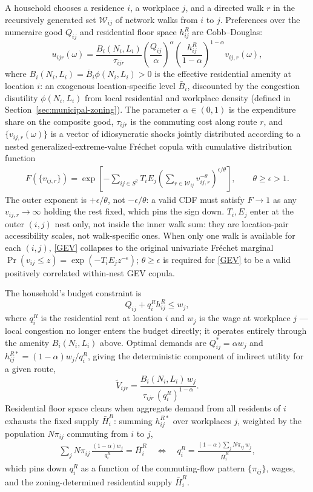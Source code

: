 \documentclass[12pt, a4paper]{article}
\theoremstyle{definition}
\theoremstyle{remark}
\begin{document}
A household chooses a residence $i$, a workplace $j$, and a directed walk $r$ in the recursively generated set $\mathcal W_{ij}$ of network walks from $i$ to $j$. Preferences over the numeraire good $Q_{ij}$ and residential floor space $h_{ij}^R$ are Cobb--Douglas:
\[
u_{ijr}(\omega) = \frac{B_i(N_i,L_i)}{\tau_{ijr}}
\left(\frac{Q_{ij}}{\alpha}\right)^{\!\alpha}
\left(\frac{h_{ij}^R}{1-\alpha}\right)^{\!1-\alpha}
v_{ij,r}(\omega),
\]
where $B_i(N_i,L_i) = \bar B_i \phi(N_i,L_i) > 0$ is the effective residential amenity at location $i$: an exogenous location-specific level $\bar B_i$, discounted by the congestion disutility $\phi(N_i,L_i)$ from local residential and workplace density (defined in Section~\ref{sec:municipal-zoning}). The parameter $\alpha \in (0,1)$ is the expenditure share on the composite good, $\tau_{ijr}$ is the commuting cost along route $r$, and $\{v_{ij,r}(\omega)\}$ is a vector of idiosyncratic shocks jointly distributed according to a nested generalized-extreme-value Fréchet copula with cumulative distribution function
\begin{align}
    \label{GEV}
    F(\{v_{ij,r}\}) = \exp\!\left[-\sum_{ij \in S^{2}} T_iE_j\left(\sum_{r\in \mathcal W_{ij}}v_{ij,r}^{-\theta}\right)^{\!\epsilon/\theta}\right], \qquad \theta \geq \epsilon > 1.
\end{align}
The outer exponent is $+\epsilon/\theta$, not $-\epsilon/\theta$: a valid CDF must satisfy $F\to1$ as any $v_{ij,r}\to\infty$ holding the rest fixed, which pins the sign down. $T_i,E_j$ enter at the outer $(i,j)$ nest only, not inside the inner walk sum: they are location-pair accessibility scales, not walk-specific ones. When only one walk is available for each $(i,j)$, \eqref{GEV} collapses to the original univariate Fréchet marginal $\Pr(v_{ij}\leq z)=\exp(-T_iE_jz^{-\epsilon})$; $\theta\geq\epsilon$ is required for \eqref{GEV} to be a valid positively correlated within-nest GEV copula.

The household's budget constraint is
\[
Q_{ij} + q_i^R h_{ij}^R \leq w_j,
\]
where $q_i^R$ is the residential rent at location $i$ and $w_j$ is the wage at workplace $j$ — local congestion no longer enters the budget directly; it operates entirely through the amenity $B_i(N_i,L_i)$ above. Optimal demands are $Q_{ij}^* = \alpha w_j$ and $h_{ij}^{R*} = (1-\alpha)w_j/q_i^R$, giving the deterministic component of indirect utility for a given route,
\[
\tilde{V}_{ijr} = \frac{B_i(N_i,L_i)\, w_j}{\tau_{ijr}\,(q_i^R)^{1-\alpha}}.
\]
Residential floor space clears when aggregate demand from all residents of $i$ exhausts the fixed supply $\bar H_i^R$: summing $h_{ij}^{R*}$ over workplaces $j$, weighted by the population $N\pi_{ij}$ commuting from $i$ to $j$,
\begin{align}
    \label{eq:rent-clearing}
    \sum_j N\pi_{ij}\,\frac{(1-\alpha)w_j}{q_i^R} = \bar H_i^R
    \quad\Longleftrightarrow\quad
    q_i^R = \frac{(1-\alpha)\sum_j N\pi_{ij}\,w_j}{\bar H_i^R},
\end{align}
which pins down $q_i^R$ as a function of the commuting-flow pattern $\{\pi_{ij}\}$, wages, and the zoning-determined residential supply $\bar H_i^R$.
\end{document}
